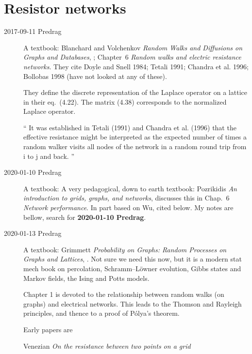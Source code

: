 
\section{Resistor networks}
\label{sect:resistors}

\begin{description}

\item[2017-09-11 Predrag]
A textbook:
Blanchard and Volchenkov
{\em Random Walks and Diffusions on Graphs and Databases},
; Chapter~6 {\em Random walks and electric resistance
networks}. They cite Doyle and Snell 1984; Tetali 1991; Chandra et al.
1996; Bollobas 1998 (have not looked at any of these).

They define the discrete representation of the Laplace
operator on a lattice in their eq.~(4.22). The matrix (4.38) corresponds
to the normalized Laplace operator.

``
It was established in Tetali (1991) and Chandra et al. (1996) that the
effective resistance might be interpreted as the expected number
of times a random walker visits all nodes of the network in a random
round trip from i to j and back.
''

\item[2020-01-10 Predrag]
A textbook:
A very pedagogical, down to earth textbook:
Pozrikidis
{\em An introduction to grids, graphs, and networks},
 discusses this in
Chap.~6 {\em Network performance}. In part based on
Wu, cited below. My notes are bellow, search for
{\bf 2020-01-10 Predrag}.

\item[2020-01-13 Predrag]
A textbook:
Grimmett {\em Probability on Graphs: Random Processes on
Graphs and Lattices}, .
Not sure we need this now, but it is a modern stat mech book on
percolation, Schramm–L\"owner evolution, Gibbs states and Markov fields,
the Ising and Potts models.

Chapter 1 is devoted to the relationship between random walks (on graphs)
and electrical networks. This leads to the Thomson and Rayleigh
principles, and thence to a proof of P\'olya's theorem.

\bigskip
Early papers are

Venezian
{\em On the resistance between two points on a grid}


\end{description}
